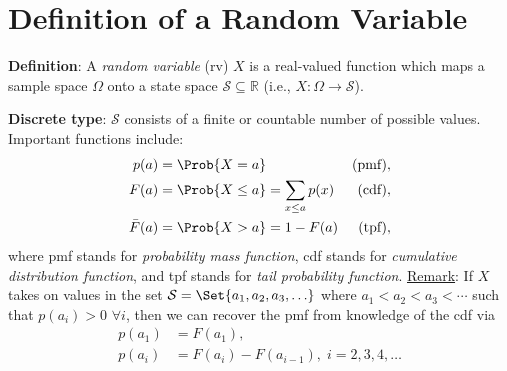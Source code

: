 \section*{Definition of a Random Variable}
\begin{Regular}
    \textbf{Definition}: A \emph{random variable} (rv) $ X $ is a real-valued function which maps a sample space $ \Omega $ onto
    a state space $ \mathcal{S}\subseteq\mathbb{R} $ (i.e., $ X\colon \Omega \to \mathcal{S} $).
\end{Regular}
\begin{Regular}
    \textbf{Discrete type}: $ \mathcal{S} $ consists of a finite or countable number of possible values. Important
    functions include:
    \begin{align*}
        p(a)       & =\Prob{X=a}                      & \text{(pmf)}, \\
        F(a)       & =\Prob{X\le a}=\sum_{x\le a}p(x) & \text{(cdf)}, \\
        \bar{F}(a) & =\Prob{X>a}=1-F(a)               & \text{(tpf)},
    \end{align*}
    where pmf stands for \emph{probability mass function}, cdf stands for \emph{cumulative distribution
        function}, and tpf stands for \emph{tail probability function}.
    \tcblower{}
    \underline{Remark}: If $ X $ takes on values in the set $ \mathcal{S}=\Set{a_1,a_2,a_3,\ldots} $ where $ a_1<a_2<a_3<\cdots $
    such that $ p(a_i)>0 $ $ \forall i $, then we can recover the pmf from knowledge of the cdf via
    \begin{align*}
        p(a_1) & =F(a_1),                            \\
        p(a_i) & =F(a_i)-F(a_{i-1}),\;i=2,3,4,\ldots
    \end{align*}
\end{Regular}
